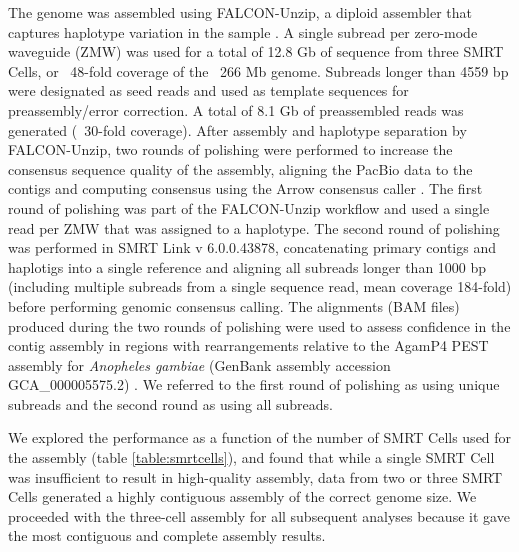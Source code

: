 \par{
The genome was assembled using FALCON-Unzip, a diploid assembler that captures haplotype variation in the sample \cite{falcon}. A single subread per zero-mode waveguide (ZMW) was used for a total of 12.8 Gb of sequence from three SMRT Cells, or ~48-fold coverage of the ~266 Mb genome. Subreads longer than 4559 bp were designated as seed reads and used as template sequences for preassembly/error correction. A total of 8.1 Gb of preassembled reads was generated (~30-fold coverage). After assembly and haplotype separation by FALCON-Unzip, two rounds of polishing were performed to increase the consensus sequence quality of the assembly, aligning the PacBio data to the contigs and computing consensus using the Arrow consensus caller \cite{arrow}. The first round of polishing was part of the FALCON-Unzip workflow and used a single read per ZMW that was assigned to a haplotype. The second round of polishing was performed in SMRT Link v 6.0.0.43878, concatenating primary contigs and haplotigs into a single reference and aligning all subreads longer than 1000 bp (including multiple subreads from a single sequence read, mean coverage 184-fold) before performing genomic consensus calling. The alignments (BAM files) produced during the two rounds of polishing were used to assess confidence in the contig assembly in regions with rearrangements relative to the AgamP4 PEST assembly for \textit{Anopheles gambiae} (GenBank assembly accession GCA\_000005575.2) \cite{PEST}\cite{PEST2}. We referred to the first round of polishing as using unique subreads and the second round as using all subreads.
}

\par{
We explored the performance as a function of the number of SMRT Cells used for the assembly (table \ref{table:smrtcells}), and found that while a single SMRT Cell was insufficient to result in high-quality assembly, data from two or three SMRT Cells generated a highly contiguous assembly of the correct genome size. We proceeded with the three-cell assembly for all subsequent analyses because it gave the most contiguous and complete assembly results.
}

